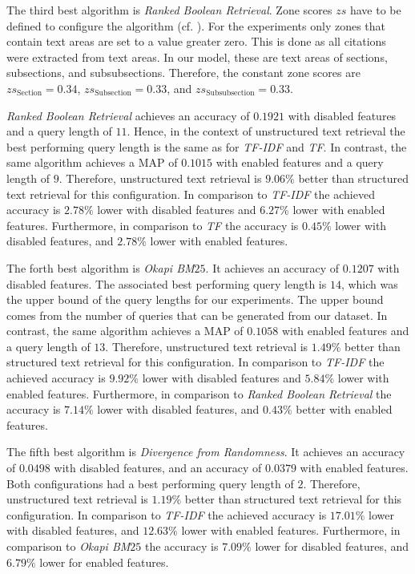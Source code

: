 The third best algorithm is \textit{Ranked Boolean Retrieval}. Zone scores $zs$ have to be defined to configure the algorithm (cf. ). For the experiments only zones that contain text areas are set to a value greater zero. This is done as all citations were extracted from text areas. In our model, these are text areas of sections, subsections, and subsubsections. Therefore, the constant zone scores are $zs_{\text{Section}} = 0.34$, $zs_{\text{Subsection}} = 0.33$, and $zs_{\text{Subsubsection}} = 0.33$.

\textit{Ranked Boolean Retrieval} achieves an accuracy of $0.1921$ with disabled features and a query length of $11$. Hence, in the context of unstructured text retrieval the best performing query length is the same as for \textit{TF-IDF} and \textit{TF}. In contrast, the same algorithm achieves a MAP of $0.1015$ with enabled features and a query length of $9$. Therefore, unstructured text retrieval is $9.06 \%$ better than structured text retrieval for this configuration. In comparison to \textit{TF-IDF} the achieved accuracy is $2.78 \%$ lower with disabled features and $6.27 \%$ lower with enabled features. Furthermore, in comparison to \textit{TF} the accuracy is $0.45 \%$ lower with disabled features, and $2.78 \%$ lower with enabled features.

The forth best algorithm is \textit{Okapi BM$25$}. It achieves an accuracy of $0.1207$ with disabled features. The associated best performing query length is $14$, which was the upper bound of the query lengths for our experiments. The upper bound comes from the number of queries that can be generated from our dataset. In contrast, the same algorithm achieves a MAP of $0.1058$ with enabled features and a query length of $13$. Therefore, unstructured text retrieval is $1.49 \%$ better than structured text retrieval for this configuration. In comparison to \textit{TF-IDF} the achieved accuracy is $9.92 \%$ lower with disabled features and $5.84 \%$ lower with enabled features. Furthermore, in comparison to \textit{Ranked Boolean Retrieval} the accuracy is $7.14 \%$ lower with disabled features, and $0.43 \%$ better with enabled features.

The fifth best algorithm is \textit{Divergence from Randomness}. It achieves an accuracy of $0.0498$ with disabled features, and an accuracy of $0.0379$ with enabled features. Both configurations had a best performing query length of $2$. Therefore, unstructured text retrieval is $1.19 \%$ better than structured text retrieval for this configuration. In comparison to \textit{TF-IDF} the achieved accuracy is $17.01 \%$ lower with disabled features, and $12.63 \%$ lower with enabled features. Furthermore, in comparison to \textit{Okapi BM$25$} the accuracy is $7.09 \%$ lower for disabled features, and $6.79 \%$ lower for enabled features.

